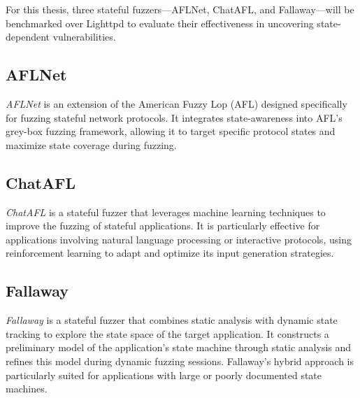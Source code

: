 For this thesis, three stateful fuzzers—AFLNet, ChatAFL, and Fallaway—will be benchmarked over Lighttpd to evaluate their effectiveness in uncovering state-dependent vulnerabilities.

\subsection{AFLNet}
\textit{AFLNet} is an extension of the American Fuzzy Lop (AFL) designed specifically for fuzzing stateful network protocols. It integrates state-awareness into AFL's grey-box fuzzing framework, allowing it to target specific protocol states and maximize state coverage during fuzzing.

\subsection{ChatAFL}
\textit{ChatAFL} is a stateful fuzzer that leverages machine learning techniques to improve the fuzzing of stateful applications. It is particularly effective for applications involving natural language processing or interactive protocols, using reinforcement learning to adapt and optimize its input generation strategies.

\subsection{Fallaway}
\textit{Fallaway} is a stateful fuzzer that combines static analysis with dynamic state tracking to explore the state space of the target application. It constructs a preliminary model of the application's state machine through static analysis and refines this model during dynamic fuzzing sessions. Fallaway's hybrid approach is particularly suited for applications with large or poorly documented state machines.
